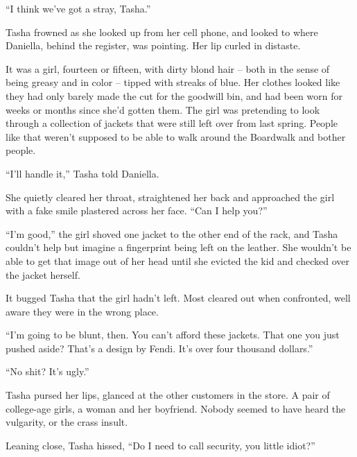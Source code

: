 





``I think we've got a stray, Tasha.''



Tasha frowned as she looked up from her cell phone, and looked to where Daniella, behind the register, was pointing.  Her lip curled in distaste.



It was a girl, fourteen or fifteen, with dirty blond hair – both in the sense of being greasy and in color – tipped with streaks of blue.  Her clothes looked like they had only barely made the cut for the goodwill bin, and had been worn for weeks or months since she'd gotten them.  The girl was pretending to look through a collection of jackets that were still left over from last spring.  People like that weren't supposed to be able to walk around the Boardwalk and bother people.



``I'll handle it,'' Tasha told Daniella.



She quietly cleared her throat, straightened her back and approached the girl with a fake smile plastered across her face.  ``Can I help you?''



``I'm good,'' the girl shoved one jacket to the other end of the rack, and Tasha couldn't help but imagine a fingerprint being left on the leather.  She wouldn't be able to get that image out of her head until she evicted the kid and checked over the jacket herself.



It bugged Tasha that the girl hadn't left.  Most cleared out when confronted, well aware they were in the wrong place.



``I'm going to be blunt, then.  You can't afford these jackets.  That one you just pushed aside?  That's a design by Fendi.  It's over four thousand dollars.''



``No shit?  It's ugly.''



Tasha pursed her lips, glanced at the other customers in the store.  A pair of college-age girls, a woman and her boyfriend.  Nobody seemed to have heard the vulgarity, or the crass insult.



Leaning close, Tasha hissed, ``Do I need to call security, you little idiot?''



